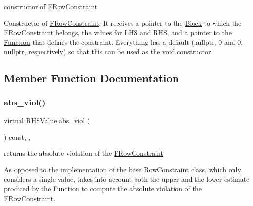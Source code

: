 constructor of \mbox{\hyperlink{class_s_m_spp__di__unipi__it_1_1_f_row_constraint}{F\+Row\+Constraint}} 

Constructor of \mbox{\hyperlink{class_s_m_spp__di__unipi__it_1_1_f_row_constraint}{F\+Row\+Constraint}}. It receives a pointer to the \mbox{\hyperlink{class_s_m_spp__di__unipi__it_1_1_block}{Block}} to which the \mbox{\hyperlink{class_s_m_spp__di__unipi__it_1_1_f_row_constraint}{F\+Row\+Constraint}} belongs, the values for L\+HS and R\+HS, and a pointer to the \mbox{\hyperlink{class_s_m_spp__di__unipi__it_1_1_function}{Function}} that defines the constraint. Everything has a default (nullptr, 0 and 0, nullptr, respectively) so that this can be used as the void constructor. 

\subsection{Member Function Documentation}
\mbox{\label{class_s_m_spp__di__unipi__it_1_1_f_row_constraint_a0d579ce7c4e40b1a0dc2dfc849942fb1}} 
\subsubsection{\texorpdfstring{abs\+\_\+viol()}{abs\_viol()}}
{\footnotesize\ttfamily virtual \mbox{\hyperlink{class_s_m_spp__di__unipi__it_1_1_row_constraint_a8813536ab3b13a81c8e83a999ade3bd8}{R\+H\+S\+Value}} abs\+\_\+viol (\begin{DoxyParamCaption}\item[{void}]{ }\end{DoxyParamCaption}) const\hspace{0.3cm}{\ttfamily [inline]}, {\ttfamily [override]}, {\ttfamily [virtual]}}



returns the absolute violation of the \mbox{\hyperlink{class_s_m_spp__di__unipi__it_1_1_f_row_constraint}{F\+Row\+Constraint}} 

As opposed to the implementation of the base \mbox{\hyperlink{class_s_m_spp__di__unipi__it_1_1_row_constraint}{Row\+Constraint}} class, which only considers a single value, takes into account both the upper and the lower estimate prodiced by the \mbox{\hyperlink{class_s_m_spp__di__unipi__it_1_1_function}{Function}} to compute the absolute violation of the \mbox{\hyperlink{class_s_m_spp__di__unipi__it_1_1_f_row_constraint}{F\+Row\+Constraint}}. 

